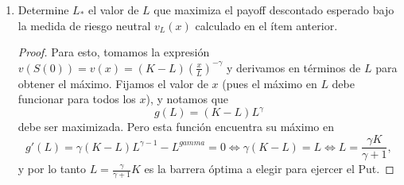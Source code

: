 \documentclass[letterpaper]{article}
\newcommand{\E}{\mathbb{E}}
\newcommand{\1}{\mathds{1}}
\theoremstyle{definition}
\theoremstyle{definition}
\theoremstyle{definition}
\theoremstyle{definition}
\theoremstyle{definition}
\begin{document}
\begin{itemize}
\begin{enumerate}
\begin{proof}
          \[
          S(t)=S(0)\exp \left\{\sigma \widetilde{W}(t)+(r-a-\frac{1}{2}\sigma^2)t\right\}  
          \]
          Denotando por $\alpha:=r-a-\frac{1}{2}\sigma^2$, notamos que 
          la función $v_L(x)$ debe estar dada por $K-x$ si $x\in [0,L]$ (justamente ejercemos la opción 
          si es que desde un inicio la opción al tiempo 0 es $S(0)=x\leq L$), y buscamos ahora 
          la expresión para la opción cuando $S(0)=x>L$. Nótese que $S(t)=L$ si y solo si
          \[
            x\exp \left\{\sigma\widetilde{W}(t)+\alpha t\right\}=L,
          \]
          lo cual ocurre si y solo si 
          \[
          -\sigma\widetilde{W}(t)-\frac{\alpha}{\sigma} t=\frac{1}{\sigma}\ln(\frac{x}{L}), 
          \]
          y aplicamos el teorema visto en clase para el movimiento browniano $-\widetilde{W}(t)$ y 
          el término de deriva $-\frac{\alpha}{\sigma} t$. En este caso usamos 
          que $\lambda=r$, $\mu=-\frac{\alpha}{\sigma}$ y $m=\frac{1}{\sigma}\ln \left(\frac{x}{L}\right)$. Esto nos da como resultado
            que 
            \[
            \widetilde{\E}\left[e^{-r\tau_m}\right]=e^{-m(-\mu+\sqrt{\mu^2+2\lambda})}    
            \]
            lo cual sustituyéndolo por las cantidades mencionadas antes, nos origina que 
            \[
            \widetilde{\E}\left[e^{-r\tau_L}\right]=\exp \left\{-\frac{1}{\sigma}\ln \left(\frac{x}{L}\right)(\frac{\alpha}{\sigma}+\sqrt{\frac{\alpha^2}{\sigma^2}+2r})\right\}=\exp \left\{-\ln \left(\frac{x}{L}\right)(\frac{\alpha}{\sigma{2}}+\frac{1}{\sigma}\sqrt{\frac{\alpha^2}{\sigma^2}+2r})\right\}=\left(\frac{x}{L}\right)^{-\gamma},
            \]
            y esta última es la expresión del precio inicial del activo $S(0)=x$.
         \end{proof}
        \item Determine $L_*$ el valor de $L$ que maximiza el payoff descontado esperado 
        bajo la medida de riesgo neutral $v_L(x)$ calculado en el ítem anterior.
        \begin{proof} 
          Para esto, tomamos la expresión $v(S(0))=v(x)=(K-L)(\frac{x}{L})^{-\gamma}$ y derivamos en términos de $L$ para 
          obtener el máximo. Fijamos el valor de $x$ (pues el máximo en $L$ debe funcionar para todos los $x$), y notamos que 
          \[
          g(L)=(K-L)L^{\gamma}  
          \]
          debe ser maximizada. Pero esta función encuentra su máximo en 
          \[
          g'(L)=\gamma(K-L)L^{\gamma-1}-L^{gamma}=0   \iff \gamma(K-L)=L \iff L=\frac{\gamma K}{\gamma+1},
          \]
          y por lo tanto $L=\frac{\gamma}{\gamma+1}K$ es la barrera óptima a elegir para ejercer el Put.




\end{proof}
\end{enumerate}
\end{itemize}
\end{document}
